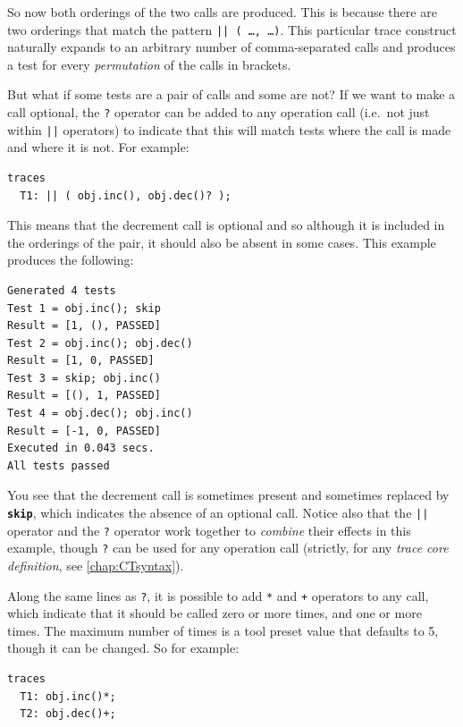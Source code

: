 \documentclass{overturerepchap}
\begin{document}
\noindent So now both orderings of the two calls are produced. This is because there are
two orderings that match the pattern \texttt{|| ( \ldots, \ldots )}. This
particular trace construct naturally expands to an arbitrary number of comma-separated
calls and produces a test for every \emph{permutation} of the calls in brackets.

But what if some tests are a pair of calls and some are not? If we want to make
a call optional, the \texttt{?} operator can be added to any operation call
(i.e.\ not just within \texttt{||} operators) to indicate that this will match
tests where the call is made and where it is not. For example:

\small
\begin{lstlisting}
traces
  T1: || ( obj.inc(), obj.dec()? );
\end{lstlisting}
\normalsize

\noindent This means that the decrement call is optional and so although it is included in
the orderings of the pair, it should also be absent in some cases. This
example produces the following:

\small
\lstset{style=tool,language=}
\begin{lstlisting}[escapechar=@]
Generated 4 tests
Test 1 = obj.inc(); skip
Result = [1, (), PASSED]
Test 2 = obj.inc(); obj.dec()
Result = [1, 0, PASSED]
Test 3 = skip; obj.inc()
Result = [(), 1, PASSED]
Test 4 = obj.dec(); obj.inc()
Result = [-1, 0, PASSED]
Executed in 0.043 secs. 
All tests passed
\end{lstlisting}
\lstset{style=mystyle}
\lstset{language=VDM++}
\normalsize

\noindent You see that the decrement call is sometimes present and sometimes replaced by
\texttt{\textbf{skip}}, which indicates the absence of an optional call. Notice also that
the \texttt{||} operator and the \texttt{?} operator work together to
\emph{combine} their effects in this example, though \texttt{?} can be used for
any operation call (strictly, for any \emph{trace core definition}, see
\ref{chap:CTsyntax}).

Along the same lines as \texttt{?}, it is possible to add \texttt{*} and
\texttt{+} operators to any call, which indicate that it should be called zero
or more times, and one or more times. The maximum number of times is a tool preset
value that defaults to 5, though it can be changed. So for example:

\small
\begin{lstlisting}
traces
  T1: obj.inc()*;
  T2: obj.dec()+;
\end{lstlisting}
\end{document}
